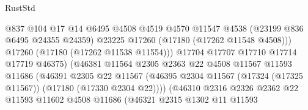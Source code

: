 \begin{lexlean}{RustStd}
\begin{coremodule}
{\begin{coremodule}
{{{{{{{{{{{{{{{{{{{{{{{{{{{{{{{{{{{{{{{{{{{{{{{{{{{{{{{                                          @837
                                          @104
                                          @17
                                          @14
                                          @6495
                                          @4508
                                          @4519
                                          @4570
                                          @11547
                                          @4538
                                          (@23199 @836 @6495 @24355 @24359)
                                          @23225
                                          @17260
                                          (@17180 (@17262 @11548 @4508)))
                                        @17260
                                        (@17180 (@17262 @11538 @11554)))
                                      @17704
                                      @17707
                                      @17710
                                      @17714
                                      @17719
                                      @46375)
                                    (@46381
                                      @11564
                                      @2305
                                      @2363
                                      @22
                                      @4508
                                      @11567
                                      @11593
                                      @11686
                                      (@46391
                                        @2305
                                        @22
                                        @11567
                                        (@46395
                                          @2304
                                          @11567
                                          (@17324 (@17325 @11567))
                                          (@17180 (@17330 @2304 @22))))
                                      (@46310
                                        @2316
                                        @2326
                                        @2362
                                        @22
                                        @11593
                                        @11602
                                        @4508
                                        @11686
                                        (@46321
                                          @2315
                                          @1302
                                          @11
                                          @11593
}}}}}}}}}}}}}}}}}}}}}}}}}}}}}}}}}}}}}}}}}}}}}}}}}}}}}}}
\end{coremodule}}
\end{coremodule}
\end{lexlean}
